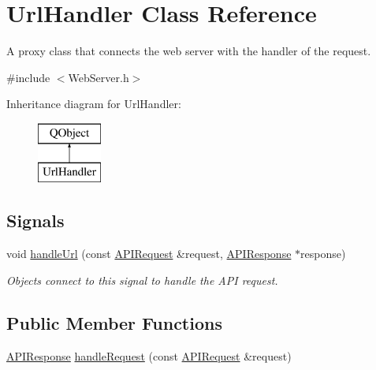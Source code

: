 \hypertarget{class_url_handler}{}\section{Url\+Handler Class Reference}
\label{class_url_handler}


A proxy class that connects the web server with the handler of the request.  




{\ttfamily \#include $<$Web\+Server.\+h$>$}

Inheritance diagram for Url\+Handler\+:\begin{figure}[H]
\begin{center}
\leavevmode
\includegraphics[height=2.000000cm]{class_url_handler}
\end{center}
\end{figure}
\subsection*{Signals}
\begin{DoxyCompactItemize}
\item 
\mbox{\label{class_url_handler_a1a519a9fc5c6e07736f430fb02719b4d}} 
void \hyperlink{class_url_handler_a1a519a9fc5c6e07736f430fb02719b4d}{handle\+Url} (const \hyperlink{class_a_p_i_request}{A\+P\+I\+Request} \&request, \hyperlink{class_a_p_i_response}{A\+P\+I\+Response} $\ast$response)
\begin{DoxyCompactList}\small\item\em Objects connect to this signal to handle the A\+PI request. \end{DoxyCompactList}\end{DoxyCompactItemize}
\subsection*{Public Member Functions}
\begin{DoxyCompactItemize}
\item 
\hyperlink{class_a_p_i_response}{A\+P\+I\+Response} \hyperlink{class_url_handler_a2c3f0bc7731a1eb5d732378c3c876043}{handle\+Request} (const \hyperlink{class_a_p_i_request}{A\+P\+I\+Request} \&request)
\end{DoxyCompactItemize}

